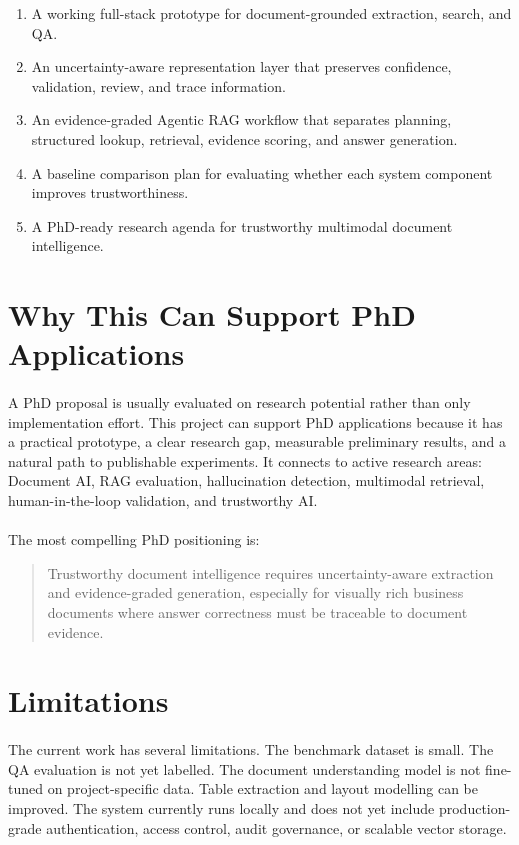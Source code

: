 \begin{enumerate}
    \item A working full-stack prototype for document-grounded extraction, search, and QA.
    \item An uncertainty-aware representation layer that preserves confidence, validation, review, and trace information.
    \item An evidence-graded Agentic RAG workflow that separates planning, structured lookup, retrieval, evidence scoring, and answer generation.
    \item A baseline comparison plan for evaluating whether each system component improves trustworthiness.
    \item A PhD-ready research agenda for trustworthy multimodal document intelligence.
\end{enumerate}

\section{Why This Can Support PhD Applications}
\paragraph{} A PhD proposal is usually evaluated on research potential rather than only implementation effort. This project can support PhD applications because it has a practical prototype, a clear research gap, measurable preliminary results, and a natural path to publishable experiments. It connects to active research areas: Document AI, RAG evaluation, hallucination detection, multimodal retrieval, human-in-the-loop validation, and trustworthy AI.

\paragraph{} The most compelling PhD positioning is:

\begin{quote}
Trustworthy document intelligence requires uncertainty-aware extraction and evidence-graded generation, especially for visually rich business documents where answer correctness must be traceable to document evidence.
\end{quote}

\section{Limitations}
\paragraph{} The current work has several limitations. The benchmark dataset is small. The QA evaluation is not yet labelled. The document understanding model is not fine-tuned on project-specific data. Table extraction and layout modelling can be improved. The system currently runs locally and does not yet include production-grade authentication, access control, audit governance, or scalable vector storage.

